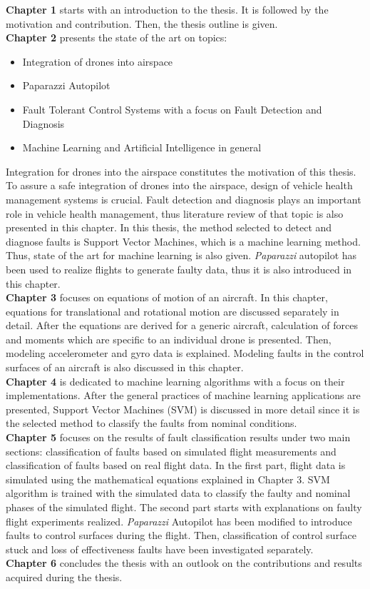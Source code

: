 \textbf{Chapter 1} starts with an introduction to the thesis. It is followed by the motivation and contribution. Then, the thesis outline is given.\\
\textbf{Chapter 2} presents the state of the art on topics: 
\begin{itemize}
\item{Integration of drones into airspace}
\item{Paparazzi Autopilot}
\item{Fault Tolerant Control Systems with a focus on Fault Detection and Diagnosis}
\item{Machine Learning and Artificial Intelligence in general}
\end{itemize}
Integration for drones into the airspace constitutes the motivation of this thesis. To assure a safe integration of drones into the airspace, design of vehicle health management systems is crucial. Fault detection and diagnosis plays an important role in vehicle health management, thus literature review of that topic is also presented in this chapter. In this thesis, the method selected to detect and diagnose faults is Support Vector Machines, which is a machine learning method. Thus, state of the art for machine learning is also given. \emph{Paparazzi} autopilot has been used to realize flights to generate faulty data, thus it is also introduced in this chapter.\\
\textbf{Chapter 3} focuses on equations of motion of an aircraft. In this chapter, equations for translational and rotational motion are discussed separately in detail. After the equations are derived for a generic aircraft, calculation of forces and moments which are specific to an individual drone is presented. Then, modeling accelerometer and gyro data is explained. Modeling faults in the control surfaces of an aircraft is also discussed in this chapter.\\
\textbf{Chapter 4} is dedicated to machine learning algorithms with a focus on their implementations. After the general practices of machine learning applications are presented, Support Vector Machines (SVM) is discussed in more detail since it is the selected method to classify the faults from nominal conditions.\\
\textbf{Chapter 5} focuses on the results of fault classification results under two main sections: classification of faults based on simulated  flight measurements and classification of faults based on real flight data. In the first part, flight data is simulated using the mathematical equations explained in Chapter 3. SVM algorithm is trained with the simulated data to classify the faulty and nominal phases of the simulated flight. The second part starts with explanations on faulty flight experiments realized. \emph{Paparazzi} Autopilot has been modified to introduce faults to control surfaces during the flight. Then, classification of control surface stuck and loss of effectiveness faults have been investigated separately.\\
\textbf{Chapter 6} concludes the thesis with an outlook on the contributions and results acquired during the thesis.